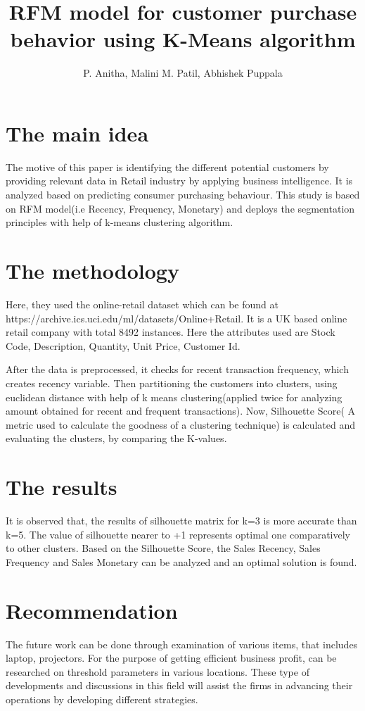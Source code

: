 \documentclass[a4paper]{article}
\title{RFM model for customer purchase behavior using K-Means algorithm}
\author[1]{P. Anitha, Malini M. Patil, Abhishek Puppala}
\begin{document}
\maketitle
\section{The main idea}

The motive of this paper is identifying the different potential customers by providing relevant data in Retail industry by applying business intelligence. It is analyzed based on predicting consumer purchasing behaviour. This study is based on RFM model(i.e Recency, Frequency, Monetary) and deploys the segmentation principles with help of k-means clustering algorithm. 

\section{The methodology }

Here, they used the online-retail dataset which can be found at https://archive.ics.uci.edu/ml/datasets/Online+Retail. It is a UK based online retail company with total 8492 instances. Here the attributes used are Stock Code, Description, Quantity, Unit Price, Customer Id.

After the data is preprocessed, it checks for recent transaction frequency, which creates recency variable. Then partitioning the customers into clusters, using euclidean distance with help of k means clustering(applied twice for analyzing amount obtained for recent and frequent transactions). Now, Silhouette Score( A metric used to calculate the goodness of a clustering technique) is calculated and evaluating the clusters, by comparing the K-values.

\section{The results}
 
It is observed that, the results of silhouette matrix for k=3 is more accurate than k=5. The value of silhouette nearer to +1 represents optimal one comparatively to other clusters. Based on the Silhouette Score, the Sales Recency, Sales Frequency and Sales Monetary can be analyzed and an optimal solution is found.

\section{Recommendation}

The future work can be done through examination of various items, that includes laptop, projectors. For the purpose of getting efficient business profit, can be researched on threshold parameters in various locations. These type of developments and discussions in this field will assist the firms in advancing their operations by developing different strategies. 
\end{document}
